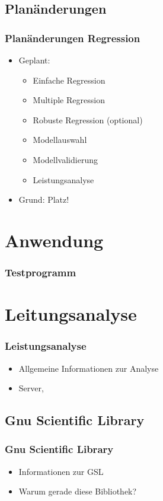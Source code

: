 \documentclass{beamer}
\begin{document}
\subsection{Planänderungen}
\begin{frame}
  \frametitle{Planänderungen Regression}

  \begin{itemize}
  \item Geplant:
    \begin{itemize}
    \item Einfache Regression
    \item Multiple Regression
    \item {Robuste Regression (optional)}
    \item Modellauswahl
    \item {Modellvalidierung}
    \item Leistungsanalyse
    \end{itemize}
    
    \pause\pause
  
  \item Grund: Platz!
  \end{itemize}

\end{frame}


\section{Anwendung}
\begin{frame}
  \frametitle{Testprogramm}

\end{frame}

\section{Leitungsanalyse}
\begin{frame}
  \frametitle{Leistungsanalyse}
  
  \begin{itemize}
  \item Allgemeine Informationen zur Analyse
  \item Server, 
  \end{itemize}
\end{frame}

\subsection{Gnu Scientific Library}
\begin{frame}
  \frametitle{Gnu Scientific Library}
  
  \begin{itemize}
  \item Informationen zur GSL
  \item Warum gerade diese Bibliothek?
  \end{itemize}
  
\end{frame}
\end{document}
